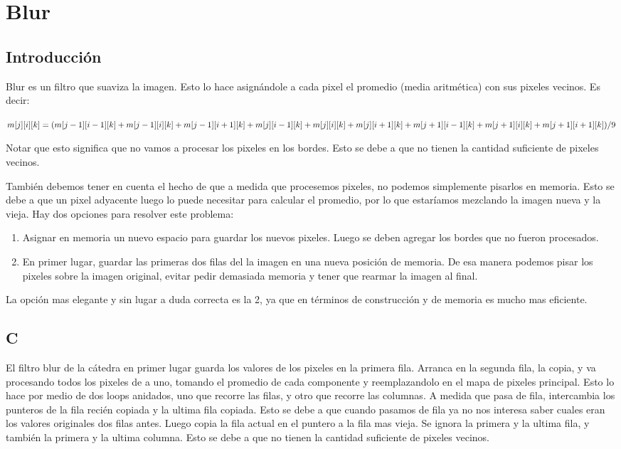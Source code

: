 \section{Blur}

\subsection{Introducción}
Blur es un filtro que suaviza la imagen. Esto lo hace asignándole a cada pixel el promedio (media aritmética) con sus pixeles vecinos. Es decir:

$m[j][i][k] = (m[j-1][i-1][k] + m[j-1][i][k] + m[j-1][i+1][k] + \\
m[j] [i-1][k] + m[j] [i][k] + m[j] [i+1][k] + \\
m[j+1][i-1][k] + m[j+1][i][k] + m[j+1][i+1][k] ) / 9$

Notar que esto significa que no vamos a procesar los pixeles en los bordes. Esto se debe a que no tienen la cantidad suficiente de pixeles vecinos.

También debemos tener en cuenta el hecho de que a medida que procesemos pixeles, no podemos simplemente pisarlos en memoria. Esto se debe a que un pixel adyacente luego lo puede necesitar para calcular el promedio, por lo que estaríamos mezclando la imagen nueva y la vieja. Hay dos opciones para resolver este problema:
\begin{enumerate}
\item Asignar en memoria un nuevo espacio para guardar los nuevos pixeles. Luego se deben agregar los bordes que no fueron procesados.
\item En primer lugar, guardar las primeras dos filas del la imagen en una nueva posición de memoria. De esa manera podemos pisar los pixeles sobre la imagen original, evitar pedir demasiada memoria y tener que rearmar la imagen al final.
\end{enumerate}
La opción mas elegante y sin lugar a duda correcta es la 2, ya que en términos de construcción y de memoria es mucho mas eficiente.

\subsection{C}
El filtro blur de la cátedra en primer lugar guarda los valores de los pixeles en la primera fila. Arranca en la segunda fila, la copia, y va procesando todos los pixeles de a uno, tomando el promedio de cada componente y reemplazandolo en el mapa de pixeles principal. Esto lo hace por medio de dos loops anidados, uno que recorre las filas, y otro que recorre las columnas. A medida que pasa de fila, intercambia los punteros de la fila recién copiada y la ultima fila copiada. Esto se debe a que cuando pasamos de fila ya no nos interesa saber cuales eran los valores originales dos filas antes. Luego copia la fila actual en el puntero a la fila mas vieja. Se ignora la primera y la ultima fila, y también la primera y la ultima columna. Esto se debe a que no tienen la cantidad suficiente de pixeles vecinos.

